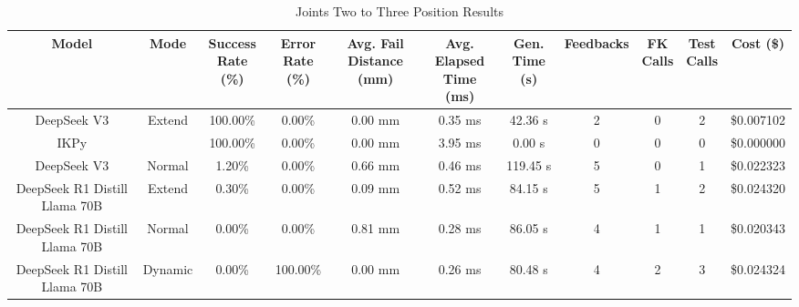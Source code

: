 \begin{table}[H]
\tiny
\renewcommand{\arraystretch}{1.2}
\caption{Joints Two to Three Position Results}
\begin{center}
\begin{tabular}{|c|c|c|c|c|c|c|c|c|c|c|}
    \hline
    \textbf{Model} & 
    \textbf{Mode} & 
    \makecell{\textbf{Success}\\\textbf{Rate (\%)}} &
    \makecell{\textbf{Error}\\\textbf{Rate (\%)}} &
    \makecell{\textbf{Avg. Fail}\\\textbf{Distance (mm)}} &
    \makecell{\textbf{Avg. Elapsed}\\\textbf{Time (ms)}} &
    \makecell{\textbf{Gen.}\\\textbf{Time (s)}} &
    \textbf{Feedbacks} &
    \makecell{\textbf{FK}\\\textbf{Calls}} &
    \makecell{\textbf{Test}\\\textbf{Calls}} &
    \textbf{Cost (\$)} \\
    \hline
    DeepSeek V3 & Extend & 100.00\% & 0.00\% & 0.00 mm & 0.35 ms & 42.36 s & 2 & 0 & 2 & \$0.007102 \\
    \hline
    IKPy &  & 100.00\% & 0.00\% & 0.00 mm & 3.95 ms & 0.00 s & 0 & 0 & 0 & \$0.000000 \\
    \hline
    DeepSeek V3 & Normal & 1.20\% & 0.00\% & 0.66 mm & 0.46 ms & 119.45 s & 5 & 0 & 1 & \$0.022323 \\
    \hline
    DeepSeek R1 Distill Llama 70B & Extend & 0.30\% & 0.00\% & 0.09 mm & 0.52 ms & 84.15 s & 5 & 1 & 2 & \$0.024320 \\
    \hline
    DeepSeek R1 Distill Llama 70B & Normal & 0.00\% & 0.00\% & 0.81 mm & 0.28 ms & 86.05 s & 4 & 1 & 1 & \$0.020343 \\
    \hline
    DeepSeek R1 Distill Llama 70B & Dynamic & 0.00\% & 100.00\% & 0.00 mm & 0.26 ms & 80.48 s & 4 & 2 & 3 & \$0.024324 \\
    \hline
\end{tabular}
\label{Results-Position-2-3}
\end{center}
\end{table}

